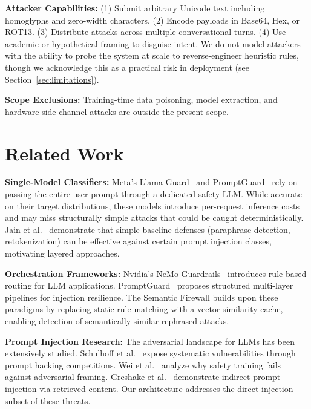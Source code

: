 \documentclass[conference]{IEEEtran}
\begin{document}
\textbf{Attacker Capabilities:} (1) Submit arbitrary Unicode text including homoglyphs and zero-width characters. (2) Encode payloads in Base64, Hex, or ROT13. (3) Distribute attacks across multiple conversational turns. (4) Use academic or hypothetical framing to disguise intent. We do not model attackers with the ability to probe the system at scale to reverse-engineer heuristic rules, though we acknowledge this as a practical risk in deployment (see Section~\ref{sec:limitations}).

\textbf{Scope Exclusions:} Training-time data poisoning, model extraction, and hardware side-channel attacks are outside the present scope.

\section{Related Work}

\textbf{Single-Model Classifiers:} Meta's Llama Guard~\cite{llamaguard} and PromptGuard~\cite{promptguard} rely on passing the entire user prompt through a dedicated safety LLM. While accurate on their target distributions, these models introduce per-request inference costs and may miss structurally simple attacks that could be caught deterministically. Jain et al.~\cite{jain_baseline} demonstrate that simple baseline defenses (paraphrase detection, retokenization) can be effective against certain prompt injection classes, motivating layered approaches.

\textbf{Orchestration Frameworks:} Nvidia's NeMo Guardrails~\cite{nemoguardrails} introduces rule-based routing for LLM applications. PromptGuard~\cite{alzahrani_promptguard} proposes structured multi-layer pipelines for injection resilience. The Semantic Firewall builds upon these paradigms by replacing static rule-matching with a vector-similarity cache, enabling detection of semantically similar rephrased attacks.

\textbf{Prompt Injection Research:} The adversarial landscape for LLMs has been extensively studied. Schulhoff et al.~\cite{schulhoff_hackaprompt} expose systematic vulnerabilities through prompt hacking competitions. Wei et al.~\cite{wei_jailbroken} analyze why safety training fails against adversarial framing. Greshake et al.~\cite{greshake_indirect} demonstrate indirect prompt injection via retrieved content. Our architecture addresses the direct injection subset of these threats.
\end{document}
